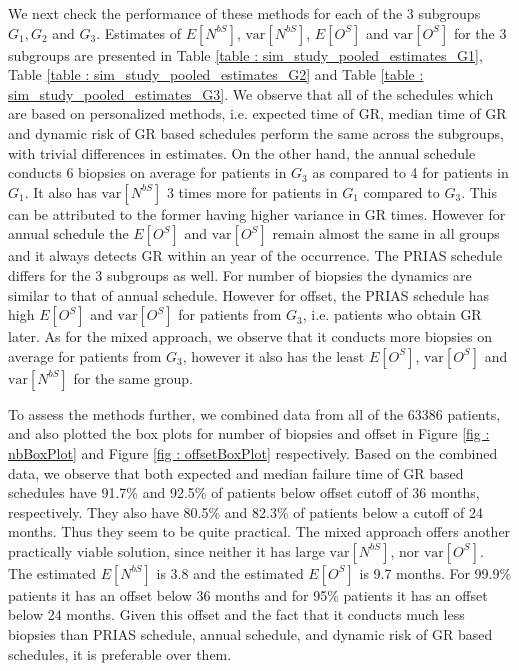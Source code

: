 We next check the performance of these methods for each of the 3 subgroups $G_1, G_2$ and $G_3$. Estimates of $E[N^{bS}]$, $\mbox{var}[N^{bS}]$, $E[O^S]$ and $\mbox{var}[O^S]$ for the 3 subgroups are presented in Table \ref{table : sim_study_pooled_estimates_G1}, Table \ref{table : sim_study_pooled_estimates_G2} and Table \ref{table : sim_study_pooled_estimates_G3}. We observe that all of the schedules which are based on personalized methods, i.e. expected time of GR, median time of GR and dynamic risk of GR based schedules perform the same across the subgroups, with trivial differences in estimates. On the other hand, the annual schedule conducts 6 biopsies on average for patients in $G_3$ as compared to 4 for patients in $G_1$. It also has $\mbox{var}[N^{bS}]$ 3 times more for patients in $G_1$ compared to $G_3$. This can be attributed to the former having higher variance in GR times. However for annual schedule the $E[O^S]$ and $\mbox{var}[O^S]$ remain almost the same in all groups and it always detects GR within an year of the occurrence. The PRIAS schedule differs for the 3 subgroups as well. For number of biopsies the dynamics are similar to that of annual schedule. However for offset, the PRIAS schedule has high $E[O^S]$ and $\mbox{var}[O^S]$ for patients from $G_3$, i.e. patients who obtain GR later. As for the mixed approach, we observe that it conducts more biopsies on average for patients from $G_3$, however it also has the least $E[O^S]$, $\mbox{var}[O^S]$ and $\mbox{var}[N^{bS}]$ for the same group.

To assess the methods further, we combined data from all of the 63386 patients, and also plotted the box plots for number of biopsies and offset in Figure \ref{fig : nbBoxPlot} and Figure \ref{fig : offsetBoxPlot} respectively. Based on the combined data, we observe that both expected and median failure time of GR based schedules have 91.7\% and 92.5\% of patients below offset cutoff of 36 months, respectively. They also have 80.5\% and 82.3\% of patients below a cutoff of 24 months. Thus they seem to be quite practical. The mixed approach offers another practically viable solution, since neither it has large $\mbox{var}[N^{bS}]$, nor $\mbox{var}[O^S]$. The estimated $E[N^{bS}]$ is 3.8 and the estimated $E[O^S]$ is 9.7 months. For 99.9\% patients it has an offset below 36 months and for 95\% patients it has an offset below 24 months. Given this offset and the fact that it conducts much less biopsies than PRIAS schedule, annual schedule, and dynamic risk of GR based schedules, it is preferable over them.

